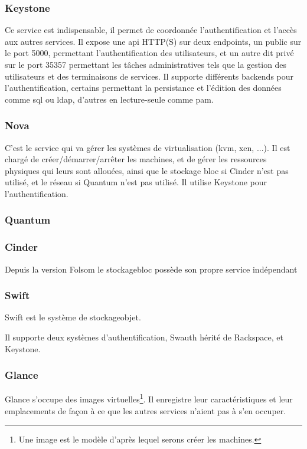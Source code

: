 \documentclass[a4paper,oneside]{report}
\begin{document}
\subsubsection{Keystone}
Ce service est indispensable, il permet de coordonnée l'authentification et l'accès aux autres services.\newline
Il expose une \gls{api} HTTP(S) sur deux endpoints, un public sur le port 5000, permettant l'authentification des utilisateurs, et un autre dit privé sur le port 35357 permettant les tâches administratives tels que la gestion des utilisateurs et des terminaisons de services.
Il supporte différents backends pour l'authentification, certains permettant la persistance et l'édition des données comme \gls{sql} ou \gls{ldap}, d'autres en lecture-seule comme \gls{pam}.\newline

\subsubsection{Nova}
C'est le service qui va gérer les systèmes de \gls{virtualisation} (\gls{kvm}, \gls{xen}, ...).
Il est chargé de créer/démarrer/arrêter les machines, et de gérer les ressources physiques qui leurs sont allouées, ainsi que le stockage bloc si Cinder n'est pas utilisé, et le réseau si Quantum n'est pas utilisé.\newline
Il utilise Keystone pour l'authentification.


\subsubsection{Quantum}


\subsubsection{Cinder}
Depuis la version Folsom le \gls{stockagebloc} possède son propre service indépendant 



\subsubsection{Swift}
Swift est le système de \gls{stockageobjet}. 

Il supporte deux systèmes d'authentification, Swauth hérité de Rackspace, et Keystone.

\subsubsection{Glance}
Glance s'occupe des images virtuelles\footnote{Une image est le modèle d'après lequel serons créer les machines.}.
Il enregistre leur caractéristiques et leur emplacements de façon à ce que les autres services n'aient pas à s'en occuper.
\end{document}
